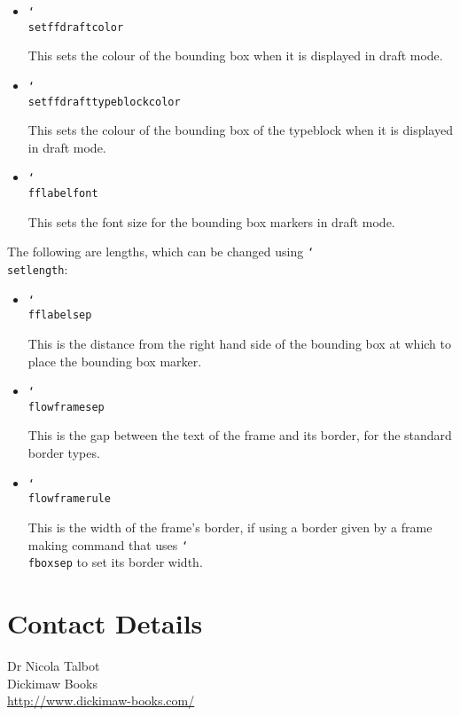\documentclass[a4paper,twoside]{report}
\newcommand{\cmdname}[1]{\texttt{\char`\\#1}}
\begin{document}
\begin{itemize}
\item \cmdname{setffdraftcolor}

This sets the colour of the bounding box
when it is displayed in draft mode.

\item
\cmdname{setffdrafttypeblockcolor}

This sets the colour of
the bounding box of the typeblock when it is displayed
in draft mode.

\item \cmdname{fflabelfont}

This sets the font size for the bounding box markers in
draft mode.

\end{itemize}

The following are lengths, which can be changed using
\cmdname{setlength}:

\begin{itemize}
\item \cmdname{fflabelsep}

This is the distance from the right hand side of the
bounding box at which to place the bounding box marker.

\item \cmdname{flowframesep}

This is the gap between the text of the frame and
its border, for the standard border types.

\item \cmdname{flowframerule}

This is the width of the frame's border, if using
a border given by a frame making command that uses \cmdname{fboxsep}
to set its border width.
\end{itemize}

\chapter*{Contact Details}

Dr Nicola Talbot\\
Dickimaw Books\\
\url{http://www.dickimaw-books.com/}
\end{document}
